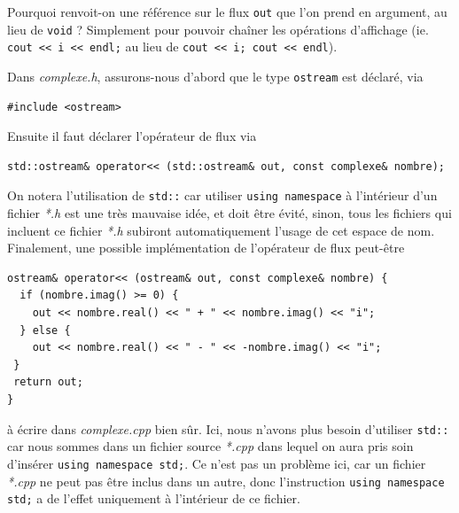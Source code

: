\documentclass{book}
\newcommand{\inline}[1]{\texttt{#1}}
\def\filename{\emph}
\begin{document}
Pourquoi renvoit-on une référence sur le flux \inline{out} que l'on prend en argument, au lieu de \inline{void} ? Simplement pour pouvoir chaîner les opérations d'affichage (ie. \inline{cout << i << endl;} au lieu de \inline{cout << i; cout << endl}).

\begin{correction}
Dans \filename{complexe.h}, assurons-nous d'abord que le type \inline{ostream} est déclaré, via
\begin{verbatim}
#include <ostream>
\end{verbatim}
Ensuite il faut déclarer l'opérateur de flux via
\begin{verbatim}
std::ostream& operator<< (std::ostream& out, const complexe& nombre);
\end{verbatim}

On notera l'utilisation de \inline{std::} car utiliser \inline{using namespace} à l'intérieur d'un fichier \filename{*.h} est une très mauvaise idée, et doit être évité, sinon, tous les fichiers qui incluent ce fichier \emph{*.h} subiront automatiquement l'usage de cet espace de nom.\\

Finalement, une possible implémentation de l'opérateur de flux peut-être
\begin{verbatim}
ostream& operator<< (ostream& out, const complexe& nombre) {
  if (nombre.imag() >= 0) {
    out << nombre.real() << " + " << nombre.imag() << "i";
  } else {
    out << nombre.real() << " - " << -nombre.imag() << "i";
 }
 return out;
}
\end{verbatim}
à écrire dans \filename{complexe.cpp} bien sûr. Ici, nous n'avons plus besoin d'utiliser \inline{std::} car nous sommes dans un fichier source \filename{*.cpp} dans lequel on aura pris soin d'insérer \inline{using namespace std;}. Ce n'est pas un problème ici, car un fichier \filename{*.cpp} ne peut pas être inclus dans un autre, donc l'instruction \inline{using namespace std;} a de l'effet uniquement à l'intérieur de ce fichier.\\
\end{correction}
\end{document}
